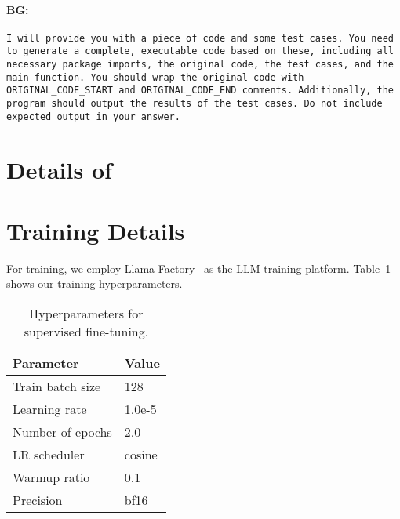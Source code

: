 \paragraph{BG:}

\begin{tcolorbox}[left=0mm,right=0mm,top=0mm,bottom=0mm,boxsep=1mm,arc=0mm,boxrule=0pt, frame empty, breakable]
    \small
    \begin{lstlisting}
I will provide you with a piece of code and some test cases. You need to generate a complete, executable code based on these, including all necessary package imports, the original code, the test cases, and the main function. You should wrap the original code with ORIGINAL_CODE_START and ORIGINAL_CODE_END comments. Additionally, the program should output the results of the test cases. Do not include expected output in your answer.
\end{lstlisting}
\end{tcolorbox}

\section{Details of \bench}












\section{Training Details}
\label{appx:training}
For training, we employ Llama-Factory~\citep{zheng2024llamafactory} as the LLM training platform. Table~\ref{tab:hyperparameters} shows our training hyperparameters.


\begin{table}[!h]
    \centering
    \caption{Hyperparameters for supervised fine-tuning.}
        \label{tab:hyperparameters}
    \begin{tabular}{ll}
        \toprule
        Parameter        & Value                                           \\
        \midrule
        Train batch size & 128                                              \\
        Learning rate    & 1.0e-5                                          \\
        Number of epochs & 2.0                                             \\
        LR scheduler     & cosine                                          \\
        Warmup ratio     & 0.1                                             \\
        Precision        & bf16                                            \\
        \bottomrule
    \end{tabular}
\end{table}